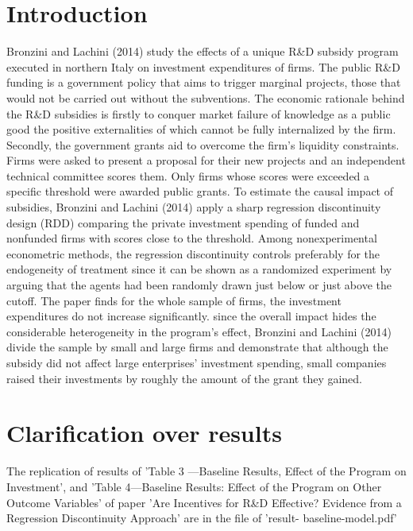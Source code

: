 \documentclass[11pt, a4paper, leqno]{article}
\begin{document}
\section{Introduction} %
\label{sec:introduction}
Bronzini and Lachini (2014) study the effects of a unique R\&D subsidy program
executed in northern Italy on investment expenditures of firms.
The public R\&D funding is a government policy that aims to trigger marginal projects,
those that would not be carried out without the subventions. The economic rationale
behind the R\&D subsidies is firstly to conquer market failure of knowledge as a
public good the positive externalities of which cannot be fully internalized by the
firm. Secondly, the government grants aid to overcome the firm's liquidity
constraints. Firms were asked to present a proposal for their new projects and
an independent technical committee scores them. Only firms whose scores were exceeded
a specific threshold were awarded public grants. To estimate the causal impact of
subsidies, Bronzini and Lachini (2014) apply a sharp regression discontinuity design
(RDD) comparing the private investment spending of funded and nonfunded firms with
scores close to the threshold. Among nonexperimental econometric methods, the
regression discontinuity controls preferably for the endogeneity of treatment since
it can be shown as a randomized experiment by arguing that the agents had been
randomly drawn just below or just above the cutoff. The paper finds for the whole
sample of firms, the investment expenditures do not increase significantly.
since the overall impact hides the considerable heterogeneity in the program’s effect,
Bronzini and Lachini (2014) divide the sample by small and large firms and demonstrate
that although the subsidy did not affect large enterprises' investment spending,
small companies raised their investments by roughly the amount of the grant they
gained.


\section{Clarification over results} %
\label{sec:baseline}
The replication of results of 'Table 3 —Baseline Results, Effect of the
Program on Investment', and 'Table 4—Baseline Results: Effect of the Program
on Other Outcome Variables' of paper 'Are Incentives for R&D Effective?
Evidence from a Regression Discontinuity Approach' are in the file of 'result-
baseline-model.pdf'
\end{document}
